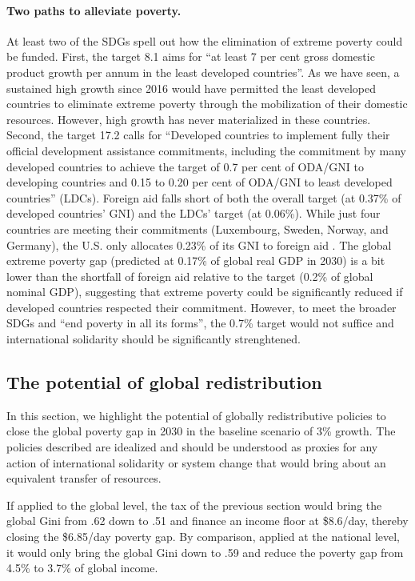 \documentclass[12pt,english]{article}
\begin{document}
\paragraph{Two paths to alleviate poverty.}
At least two of the SDGs spell out how the elimination of extreme poverty could be funded. %
First, the target 8.1 aims for ``at least 7 per cent gross domestic product growth per annum in the least developed countries''. As we have seen, a sustained high growth since 2016 would have permitted the least developed countries to eliminate extreme poverty through the mobilization of their domestic resources. However, high growth has never materialized in these countries. 
Second, the target 17.2 calls for ``Developed countries to implement fully their official development assistance commitments, including the commitment by many developed countries to achieve the target of 0.7 per cent of ODA/GNI to developing countries and 0.15 to 0.20 per cent of ODA/GNI to least developed countries'' (LDCs). Foreign aid falls short of both the overall target (at 0.37\% of developed countries' GNI) and the LDCs' target (at 0.06\%). While just four countries are meeting their commitments (Luxembourg, Sweden, Norway, and Germany), the U.S. only allocates 0.23\% of its GNI to foreign aid \citep{oecd_oda_2023}. The global extreme poverty gap (predicted at 0.17\% of global real GDP in 2030) is a bit lower than the shortfall of foreign aid relative to the target (0.2\% of global nominal GDP), suggesting that extreme poverty could be significantly reduced if developed countries respected their commitment. %
However, to meet the broader SDGs and ``end poverty in all its forms'', the 0.7\% target would not suffice and international solidarity should be significantly strenghtened. %

\subsection{The potential of global redistribution\label{subsec:global}} %

In this section, we highlight the potential of globally redistributive policies to close the global poverty gap in 2030 in the baseline scenario of 3\% growth. The policies described are idealized and should be understood as proxies for any action of international solidarity or system change that would bring about an equivalent transfer of resources. %

If applied to the global level, the tax of the previous section would bring the global Gini from .62 down to .51 and finance an income floor at \$8.6/day, thereby closing the \$6.85/day poverty gap. By comparison, applied at the national level, it would only bring the global Gini down to .59 and reduce the poverty gap from 4.5\% to 3.7\% of global income. 
\end{document}
